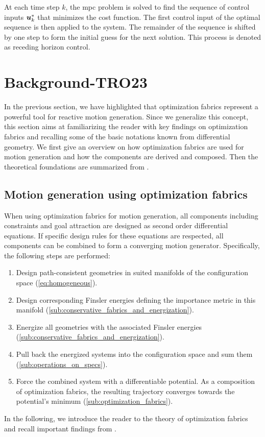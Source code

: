 At each time step $k$, the \ac{mpc} problem is solved to
find the sequence of control inputs $\bm{u}_k^*$ that minimizes
the cost function. The first control input of the optimal
sequence is then applied to the system. The remainder of the
sequence is shifted by one step to form the initial guess
for the next solution. This process is denoted as receding
horizon control.











\section{Background-TRO23}%
\label{sec:mathematics}

In the previous section, we have highlighted that optimization fabrics represent a
powerful tool for reactive motion generation. Since we generalize this concept, this
section aims at familiarizing the reader with key findings on optimization fabrics and
recalling some of the basic notations known from differential geometry. 
We first give an overview on how optimization fabrics are used for motion generation
and how the components are derived and composed. Then the theoretical foundations
are summarized from \cite{Cheng2020,Ratliff2020}.

\subsection{Motion generation using optimization fabrics}%
\label{sub:trajectory_generation_using_optimization_fabrics}

When using optimization fabrics for motion generation, all components including constraints and 
goal attraction are designed as second order differential equations. If specific design
rules for these equations are respected, all components can be combined to 
form a converging motion generator. Specifically, the following steps are performed:
%
\begin{enumerate}
  \item Design path-consistent geometries in suited manifolds of the configuration space
    (\cref{eq:homogeneous}).
  \item Design corresponding Finsler energies defining the importance metric in this manifold
    (\cref{sub:conservative_fabrics_and_energization}).
  \item Energize all geometries with the associated Finsler energies 
    (\cref{sub:conservative_fabrics_and_energization}).
  \item Pull back the energized systems into the configuration space and sum them 
    (\cref{sub:operations_on_specs}).
  \item Force the combined system with a differentiable potential. As a composition of optimization fabrics, 
    the resulting trajectory converges towards the potential's minimum
    (\cref{sub:optimization_fabrics}).
\end{enumerate}
In the following, we introduce the reader to the theory of optimization fabrics
and recall important findings from \cite{Ratliff2020}.


